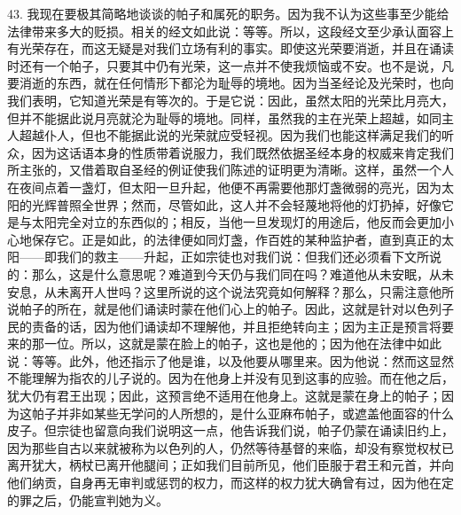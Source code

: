 43. 我现在要极其简略地谈谈的帕子和属死的职务。因为我不认为这些事至少能给法律带来多大的贬损。相关的经文如此说：等等。所以，这段经文至少承认面容上有光荣存在，而这无疑是对我们立场有利的事实。即使这光荣要消逝，并且在诵读时还有一个帕子，只要其中仍有光荣，这一点并不使我烦恼或不安。也不是说，凡要消逝的东西，就在任何情形下都沦为耻辱的境地。因为当圣经论及光荣时，也向我们表明，它知道光荣是有等次的。于是它说：因此，虽然太阳的光荣比月亮大，但并不能据此说月亮就沦为耻辱的境地。同样，虽然我的主在光荣上超越，如同主人超越仆人，但也不能据此说的光荣就应受轻视。因为我们也能这样满足我们的听众，因为这话语本身的性质带着说服力，我们既然依据圣经本身的权威来肯定我们所主张的，又借着取自圣经的例证使我们陈述的证明更为清晰。这样，虽然一个人在夜间点着一盏灯，但太阳一旦升起，他便不再需要他那灯盏微弱的亮光，因为太阳的光辉普照全世界；然而，尽管如此，这人并不会轻蔑地将他的灯扔掉，好像它是与太阳完全对立的东西似的；相反，当他一旦发现灯的用途后，他反而会更加小心地保存它。正是如此，的法律便如同灯盏，作百姓的某种监护者，直到真正的太阳——即我们的救主——升起，正如宗徒也对我们说：但我们还必须看下文所说的：那么，这是什么意思呢？难道到今天仍与我们同在吗？难道他从未安眠，从未安息，从未离开人世吗？这里所说的这个说法究竟如何解释？那么，只需注意他所说帕子的所在，就是他们诵读时蒙在他们心上的帕子。因此，这就是针对以色列子民的责备的话，因为他们诵读却不理解他，并且拒绝转向主；因为主正是预言将要来的那一位。所以，这就是蒙在脸上的帕子，这也是他的；因为他在法律中如此说：等等。此外，他还指示了他是谁，以及他要从哪里来。因为他说：然而这显然不能理解为指农的儿子说的。因为在他身上并没有见到这事的应验。而在他之后，犹大仍有君王出现；因此，这预言绝不适用在他身上。这就是蒙在身上的帕子；因为这帕子并非如某些无学问的人所想的，是什么亚麻布帕子，或遮盖他面容的什么皮子。但宗徒也留意向我们说明这一点，他告诉我们说，帕子仍蒙在诵读旧约上，因为那些自古以来就被称为以色列的人，仍然等待基督的来临，却没有察觉权杖已离开犹大，柄杖已离开他腿间；正如我们目前所见，他们臣服于君王和元首，并向他们纳贡，自身再无审判或惩罚的权力，而这样的权力犹大确曾有过，因为他在定的罪之后，仍能宣判她为义。\par

